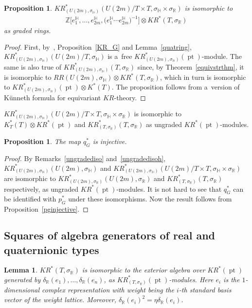 \documentclass[11pt]{article}
\numberwithin{equation}{section}
\newtheorem{Lemma}[Theorem]{Lemma}
\newtheorem{Proposition}[Theorem]{Proposition}
{\theoremstyle{definition}
\newtheorem{Definition}[Theorem]{Definition}
\newtheorem{Example}[Theorem]{Example}
\newtheorem{Remark}[Theorem]{Remark}
}
\DeclareMathOperator{\pt}{pt}
\begin{document}
\begin{Proposition}
$KR_{(U(2m),
\sigma_\mathbb{H})}^*(U(2m)/T\times T,
\sigma_\mathbb{H}
\times
\sigma_\mathbb{R})$ is isomorphic to
\begin{gather*}
\mathbb{Z}\big[e_1^\mathbb{H}, \dots, e_{2m}^\mathbb{H},
\big(e_1^\mathbb{H}\cdots e_{2m}^\mathbb{H}\big)^{-1}\big]
\otimes KR^*(T,\sigma_\mathbb{R})
\end{gather*}
as graded rings.
\end{Proposition}
\begin{proof}
First, by~\cite[Theorem~1]{P}, Proposition~\ref{KR_G} and Lemma~\ref{quatring}, $KR^*_{(U(2m),
\sigma_\mathbb{H})}(U(2m)/T,
\sigma_\mathbb{H})$ is a~free $KR_{(U(2m),
\sigma_\mathbb{H})}^*(\pt)$-module.
The same is also true of $KR_{(U(2m),
\sigma_\mathbb{H})}^*(T,
\sigma_\mathbb{R})$ since, by Theo\-rem~\ref{equivstrthm}, it is isomorphic to $RR(U(2m),
\sigma_\mathbb{H})\otimes KR^*(T,
\sigma_\mathbb{R})$, which in turn is isomorphic to $KR^*_{(U(2m),
\sigma_\mathbb{H})}(\pt)\otimes K^*(T)$.
The proposition
follows from a~version of K\"unneth formula for equivariant $KR$-theory.
\end{proof}
\begin{Remark}
\label{ungradedisoh}
$KR^*_{(U(2m),
\sigma_\mathbb{H})}(U(2m)/T\times T,
\sigma_\mathbb{H}
\times
\sigma_\mathbb{R})$ is isomorphic to $K^*_T(T)\otimes KR^*(\pt)$ and $KR^*_{(T,
\sigma_\mathbb{R})}(T,
\sigma_\mathbb{R})$ as ungraded $KR^*(\pt)$-modules.
\end{Remark}
\begin{Proposition}
\label{qginjective}
The map $q_G^*$ is injective.
\end{Proposition}
\begin{proof}
By Remarks~\ref{ungradediso} and~\ref{ungradedisoh}, $KR^*_{(U(2m),
\sigma_\mathbb{H})}(U(2m),
\sigma_\mathbb{H})$ and $KR^*_{(U(2m),
\sigma_\mathbb{H})}(U(2m)/T\times T,
\sigma_\mathbb{H}
\times
\sigma_\mathbb{R})$ are isomorphic to $KR^*_{(U(2m),
\sigma_\mathbb{R})}(U(2m),
\sigma_\mathbb{R})$ and $KR^*_{(T,
\sigma_\mathbb{R})}(T,
\sigma_\mathbb{R})$ respectively, as ungraded $KR^*(\pt)$-modules.
It is not hard to see that $q_G^*$ can be identif\/ied with $p_G^*$ under these isomorphisms.
Now the result follows from Proposition~\ref{pginjective}.
\end{proof}
\subsection{Squares of algebra generators of real and quaternionic types}
\begin{Lemma}
\label{eqkrthytorus}
$KR^*(T,
\sigma_\mathbb{R})$ is isomorphic to the exterior algebra over $KR^*(\pt)$ generated by $\delta_\mathbb{R}(e_1), \dots,
\delta_\mathbb{R}(e_n)$, as $KR^*_{(T,
\sigma_\mathbb{R})}(\pt)$-modules.
Here $e_i$ is the $1$-dimensional complex representation with weight being the $i$-th standard basis vector of the weight
lattice.
Moreover, $\delta_\mathbb{R}(e_i)^2=\eta\delta_\mathbb{R}(e_i)$.
\end{Lemma}
\end{document}
